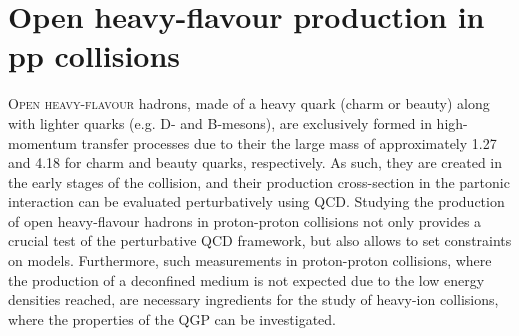 \chapter{Open heavy-flavour production in pp collisions}

\lettrine[lines=6,findent=0.pt]{O}{pen heavy-flavour} hadrons, made of a heavy quark (charm or beauty) along with lighter quarks (e.g. D- and B-mesons), are exclusively formed in high-momentum transfer processes due to their the large mass of approximately 1.27 \gevcc and 4.18 \gevcc for charm and beauty quarks, respectively. As such, they are created in the early stages of the collision, and their production cross-section in the partonic interaction can be evaluated perturbatively using QCD. Studying the production of open heavy-flavour hadrons in proton-proton collisions not only provides a crucial test of the perturbative QCD framework, but also allows to set constraints on models. Furthermore, such measurements in proton-proton collisions, where the production of a deconfined medium is not expected due to the low energy densities reached, are necessary ingredients for the study of heavy-ion collisions, where the properties of the QGP can be investigated. 


